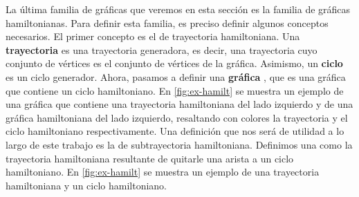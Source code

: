 La \'ultima familia de gr\'aficas que veremos en esta secci\'on es la familia de
gr\'aficas hamiltonianas. Para definir esta familia, es preciso definir algunos
conceptos necesarios. El primer concepto es el de trayectoria hamiltoniana. Una
\textbf{trayectoria}
 es una
trayectoria generadora, es decir, una trayectoria cuyo conjunto de v\'ertices es
el conjunto de v\'ertices de la gr\'afica. Asimismo, un \textbf{ciclo}
 es un ciclo generador.
Ahora, pasamos a definir una \textbf{gr\'afica}
, que es una
gr\'afica que contiene un ciclo hamiltoniano. En \cref{fig:ex-hamilt} se muestra
un ejemplo de una gr\'afica que contiene una trayectoria hamiltoniana del lado
izquierdo y de una gr\'afica hamiltoniana del lado izquierdo, resaltando con
colores la trayectoria y el ciclo hamiltoniano respectivamente. Una definici\'on
que nos ser\'a de utilidad a lo largo de este trabajo es la de subtrayectoria
hamiltoniana. Definimos una  como la trayectoria
hamiltoniana resultante de quitarle una arista a un ciclo hamiltoniano. En
\cref{fig:ex-hamilt} se muestra un ejemplo de una trayectoria hamiltoniana y un
ciclo hamiltoniano.


